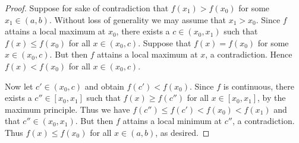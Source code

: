 \documentclass{amsart}
\begin{document}
\begin{proof}
    Suppose for sake of contradiction that $f(x_1)>f(x_0)$ for some $x_1\in(a,b)$.
    Without loss of generality we may assume that $x_1>x_0$. Since
    $f$ attains a local maximum at $x_0$, there exists a $c\in(x_0,x_1)$ such that
    $f(x)\le f(x_0)$ for all $x\in(x_0,c)$. Suppose that $f(x)=f(x_0)$ for some $x\in(x_0,c)$.
    But then $f$ attains a local maximum at $x$, a contradiction. Hence
    $f(x)<f(x_0)$ for all $x\in(x_0,c)$.

    Now let $c'\in(x_0,c)$ and obtain $f(c')<f(x_0)$. Since $f$ is continuous,
    there exists a $c''\in[x_0,x_1]$ such that $f(x)\ge f(c'')$ for all $x\in[x_0,x_1]$,
    by the maximum principle. Thus we have $f(c'')\le f(c')<f(x_0)<f(x_1)$ and that
    $c''\in(x_0,x_1)$. But then $f$ attains a local minimum at $c''$, a contradiction.
    Thus $f(x)\le f(x_0)$ for all $x\in(a,b)$, as desired.
\end{proof}
\end{document}
